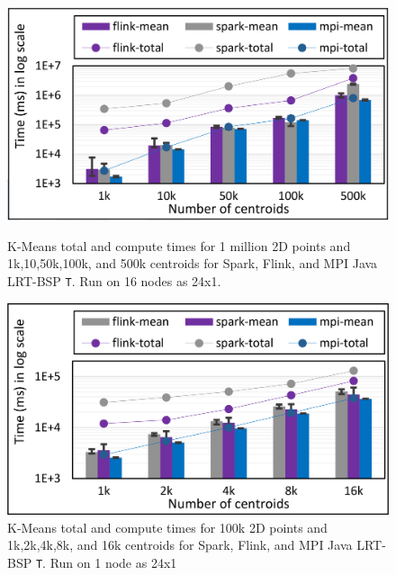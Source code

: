 \documentclass[10pt, conference, compsocconf]{IEEEtran}
\begin{document}
\begin{figure}[!htb]
	\begin{minipage}{0.49\textwidth}
        \centering
        \includegraphics[width=1\columnwidth]{images/fig_kmeans_1mil_varying_centers_Flink_Spark_MPI}
        \caption{K-Means total and compute times for 1 million 2D points and 1k,10,50k,100k, and 500k centroids for Spark, Flink, and MPI Java \ac{LRT-BSP} \texttt{T}. Run on 16 nodes as 24x1.}
        \label{fig:fig_kmeans_1mil_varying_centers_Flink_Spark_MPI}
    \end{minipage}
    \hspace{1.4mm}
    \begin{minipage}{0.49\textwidth}
        \centering
        \includegraphics[width=1\columnwidth]{images/fig_kmeans_100k_varying_centers_Flink_Spark_MPI}
        \caption{K-Means total and compute times for 100k 2D points and 1k,2k,4k,8k, and 16k centroids for Spark, Flink, and MPI Java \ac{LRT-BSP} \texttt{T}. Run on 1 node as 24x1}
        \label{fig:fig_kmeans_100k_varying_centers_Flink_Spark_MPI}
    \end{minipage}
\end{figure}
\end{document}

